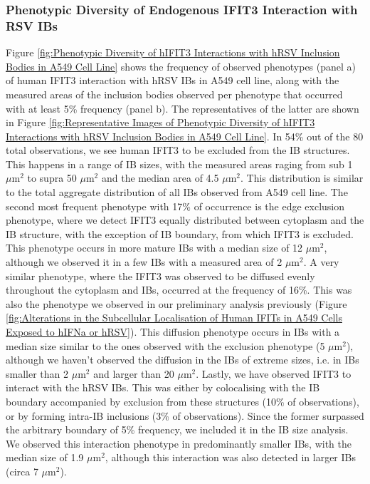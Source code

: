 \subsubsection{Phenotypic Diversity of Endogenous IFIT3 Interaction with RSV IBs}
Figure \ref{fig:Phenotypic Diversity of hIFIT3 Interactions with hRSV Inclusion Bodies in A549 Cell Line} shows the frequency of observed phenotypes (panel a) of human IFIT3 interaction with hRSV IBs in A549 cell line, along with the measured areas of the inclusion bodies observed per phenotype that occurred with at least 5\% frequency (panel b). The representatives of the latter are shown in Figure \ref{fig:Representative Images of Phenotypic Diversity of hIFIT3 Interactions with hRSV Inclusion Bodies in A549 Cell Line}. In 54\% out of the 80 total observations, we see human IFIT3 to be excluded from the IB structures. This happens in a range of IB sizes, with the measured areas raging from sub 1 \(\mu \mbox{m}^2\) to supra 50 \(\mu \mbox{m}^2\) and the median area of 4.5 \(\mu \mbox{m}^2\). This distribution is similar to the total aggregate distribution of all IBs observed from A549 cell line. The second most frequent phenotype with 17\% of occurrence is the edge exclusion phenotype, where we detect IFIT3 equally distributed between cytoplasm and the IB structure, with the exception of IB boundary, from which IFIT3 is excluded. This phenotype occurs in more mature IBs with a median size of 12 \(\mu \mbox{m}^2\), although we observed it in a few IBs with a measured area of 2 \(\mu \mbox{m}^2\). A very similar phenotype, where the IFIT3 was observed to be diffused evenly throughout the cytoplasm and IBs, occurred at the frequency of 16\%. This was also the phenotype we observed in our preliminary analysis previously (Figure \ref{fig:Alterations in the Subcellular Localisation of Human IFITs in A549 Cells Exposed to hIFNa or hRSV}). This diffusion phenotype occurs in IBs with a median size similar to the ones observed with the exclusion phenotype (5 \(\mu \mbox{m}^2\)), although we haven't observed the diffusion in the IBs of extreme sizes, i.e. in IBs smaller than 2 \(\mu \mbox{m}^2\) and larger than 20 \(\mu \mbox{m}^2\). Lastly, we have observed IFIT3 to interact with the hRSV IBs. This was either by colocalising with the IB boundary accompanied by exclusion from these structures (10\% of observations), or by forming intra-IB inclusions (3\% of observations). Since the former surpassed the arbitrary boundary of 5\% frequency, we included it in the IB size analysis. We observed this interaction phenotype in predominantly smaller IBs, with the median size of 1.9 \(\mu \mbox{m}^2\), although this interaction was also detected in larger IBs (circa 7 \(\mu \mbox{m}^2\)).

